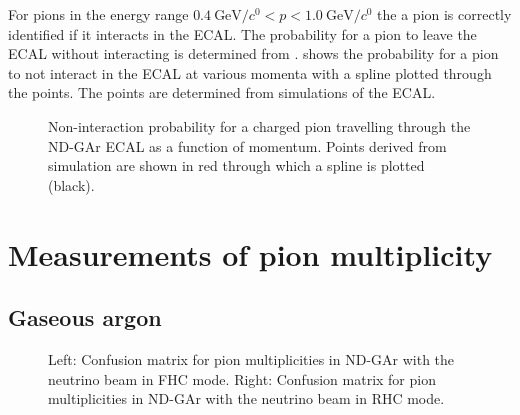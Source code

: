 For pions in the energy range $\SI{0.4}{\GeV\per\clight} < p < \SI{1.0}{\GeV\per\clight}$ the
a pion is correctly identified if it interacts in the ECAL.
The probability for a pion to leave the ECAL without interacting is determined from .
 shows the probability for a pion to not interact in the ECAL at various momenta with a spline plotted through the points.
The points are determined from simulations of the ECAL.


\begin{figure}[h]
	\centering
	\begin{adjustbox}{max totalsize=.6\linewidth, center}
		
	\end{adjustbox}
	\caption[Non-interaction probability for a charged pion travelling through the ND-GAr ECAL as a function of momentum]{Non-interaction probability for a charged pion travelling through the ND-GAr ECAL as a function of momentum. Points derived from simulation are shown in red through which a spline is plotted (black).}
	\label{fig:interactionSpline}
\end{figure}



\section{Measurements of pion multiplicity}
\label{sec:dune_ndrwt:pionMulti}



\subsection{Gaseous argon}

\begin{figure}[h]
	\begin{minipage}[t]{.5\linewidth}
		\begin{adjustbox}{max totalsize=\linewidth, center}
			
		\end{adjustbox}
	\end{minipage}
	\hfill
	\begin{minipage}[t]{.5\linewidth}
		\begin{adjustbox}{max totalsize=\linewidth, center}
			
		\end{adjustbox}
	\end{minipage}
	\caption[Confusion matrices for pion multiplicities in ND-GAr]{Left: Confusion matrix for pion multiplicities in ND-GAr with the neutrino beam in FHC mode. Right: Confusion matrix for pion multiplicities in ND-GAr with the neutrino beam in RHC mode.}
	\label{fig:confusMatPi}
\end{figure}

